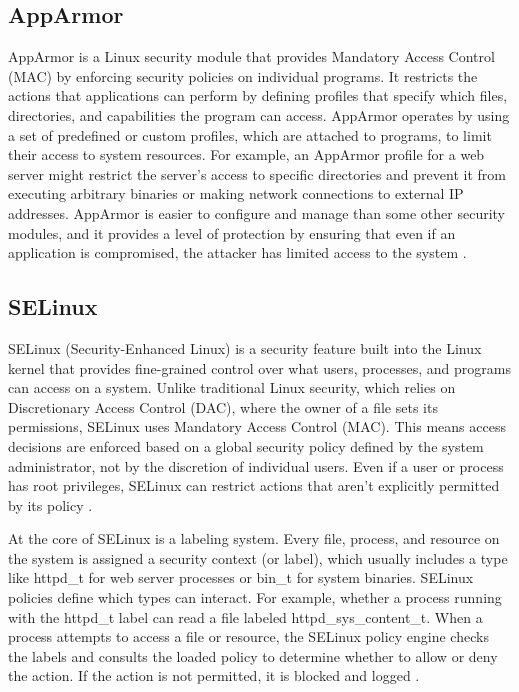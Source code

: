 \documentclass[12pt]{report}
\begin{document}
\begin{doublespace}
\subsection{AppArmor}
AppArmor is a Linux security module that provides Mandatory Access Control (MAC) by enforcing security policies on individual programs. It restricts the actions that applications can perform by defining profiles that specify which files, directories, and capabilities the program can access. AppArmor operates by using a set of predefined or custom profiles, which are attached to programs, to limit their access to system resources. For example, an AppArmor profile for a web server might restrict the server’s access to specific directories and prevent it from executing arbitrary binaries or making network connections to external IP addresses. AppArmor is easier to configure and manage than some other security modules, and it provides a level of protection by ensuring that even if an application is compromised, the attacker has limited access to the system \cite{archwiki_apparmor}.

\subsection{SELinux}
SELinux (Security-Enhanced Linux) is a security feature built into the Linux kernel that provides fine-grained control over what users, processes, and programs can access on a system. Unlike traditional Linux security, which relies on Discretionary Access Control (DAC), where the owner of a file sets its permissions, SELinux uses Mandatory Access Control (MAC). This means access decisions are enforced based on a global security policy defined by the system administrator, not by the discretion of individual users. Even if a user or process has root privileges, SELinux can restrict actions that aren't explicitly permitted by its policy \cite{redhat2007selinuxguide}.

At the core of SELinux is a labeling system. Every file, process, and resource on the system is assigned a security context (or label), which usually includes a type like httpd_t for web server processes or bin_t for system binaries. SELinux policies define which types can interact. For example, whether a process running with the httpd_t label can read a file labeled httpd_sys_content_t. When a process attempts to access a file or resource, the SELinux policy engine checks the labels and consults the loaded policy to determine whether to allow or deny the action. If the action is not permitted, it is blocked and logged \cite{redhat2007selinuxguide}.


\end{doublespace}
\end{document}

